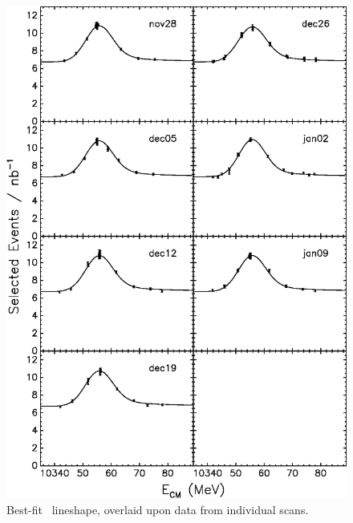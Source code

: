 \documentclass{cornell}
\begin{document}
\begin{figure}[p]
  \begin{center}
    \includegraphics[width=0.9\linewidth]{allscanssss}
  \end{center}
  \caption[Best-fit lineshape for each \usss\ scan]{\label{allscanssss} Best-fit \usss\ lineshape,
  overlaid upon data from individual scans.}
\end{figure}
\end{document}

